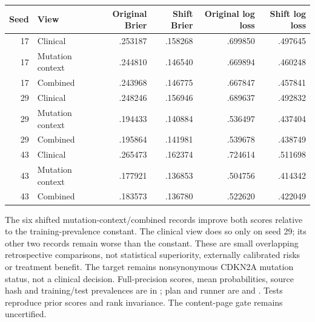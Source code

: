 \begin{center}
\begin{tabular}{rlrrrr}
\hline
Seed & View & Original Brier & Shift Brier & Original log loss & Shift log loss\\
\hline
17 & Clinical & .253187 & .158268 & .699850 & .497645\\
17 & Mutation context & .244810 & .146540 & .669894 & .460248\\
17 & Combined & .243968 & .146775 & .667847 & .457841\\
29 & Clinical & .248246 & .156946 & .689637 & .492832\\
29 & Mutation context & .194433 & .140884 & .536497 & .437404\\
29 & Combined & .195864 & .141981 & .539678 & .438749\\
43 & Clinical & .265473 & .162374 & .724614 & .511698\\
43 & Mutation context & .177921 & .136853 & .504756 & .414342\\
43 & Combined & .183573 & .136780 & .522620 & .422049\\
\hline
\end{tabular}
\end{center}

The six shifted mutation-context/combined records improve both scores relative to the training-prevalence constant. The clinical view does so only on seed 29; its other two records remain worse than the constant. These are small overlapping retrospective comparisons, not statistical superiority, externally calibrated risks or treatment benefit. The target remains nonsynonymous CDKN2A mutation status, not a clinical decision. Full-precision scores, mean probabilities, source hash and training/test prevalences are in ; plan and runner are  and . Tests reproduce prior scores and rank invariance. The content-page gate remains uncertified.
